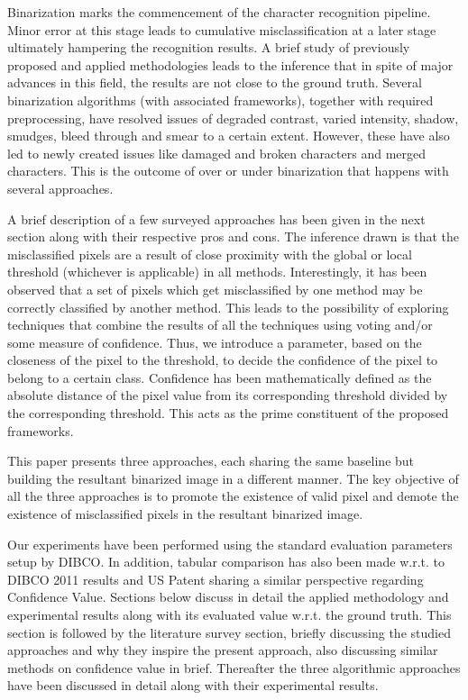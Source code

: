 \documentclass[conference]{IEEEtran}
\begin{document}
Binarization marks the commencement of the character recognition pipeline. Minor error at this stage leads to cumulative misclassification at a later stage ultimately hampering the recognition results. A brief study of previously proposed and applied methodologies leads to the inference that in spite of major advances in this field, the results are not close to the ground truth. Several binarization algorithms (with associated frameworks), together with required preprocessing, have resolved issues of degraded contrast, varied intensity, shadow, smudges, bleed through and smear to a certain extent. However, these have also led to newly created issues like damaged and broken characters and merged characters. This is the outcome of over or under binarization that happens with several approaches.

A brief description of a few surveyed approaches has been given in the next section along with their respective pros and cons. The inference drawn is that the misclassified pixels are a result of close proximity with the global or local threshold (whichever is applicable) in all methods. Interestingly, it has been observed that a set of pixels which get misclassified by one method may be correctly classified by another method. This leads to the possibility of exploring techniques that combine the results of all the techniques using voting and/or some measure of confidence. Thus, we introduce a parameter, based on the closeness of the pixel to the threshold, to decide the confidence of the pixel to belong to a certain class. Confidence has been mathematically defined as the absolute distance of the pixel value from its corresponding threshold divided by the corresponding threshold. This acts as the prime constituent of the proposed frameworks.

This paper presents three approaches, each sharing the same baseline but building the resultant binarized image in a different manner. The key objective of all the three approaches is to promote the existence of valid pixel and demote the existence of misclassified pixels in the resultant binarized image.

Our experiments have been performed using the standard evaluation parameters setup by DIBCO. In addition, tabular comparison has also been made w.r.t. to DIBCO 2011 results and US Patent sharing a similar perspective regarding Confidence Value. Sections below discuss in detail the applied methodology and experimental results along with its evaluated value w.r.t. the ground truth. This section is followed by the literature survey section, briefly discussing the studied approaches and why they inspire the present approach, also discussing similar methods on confidence value in brief. Thereafter the three algorithmic approaches have been discussed in detail along with their experimental results.
\end{document}
